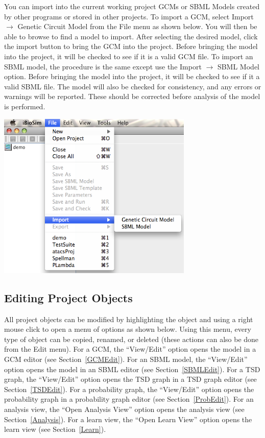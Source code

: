 \documentclass[titlepage,11pt]{article}
\begin{document}
\noindent
You can import into the current working project GCMs
or SBML Models created by other programs or stored in other projects. 
To import a GCM, select Import $\rightarrow$ Genetic Circuit Model
from the File menu as shown below. You will then be able to browse to
find a model to import.  After  selecting the desired model, click the 
import button
to bring the GCM into the project.  Before bringing the model into the 
project, it will be checked to see if it is a valid GCM file.
To import an SBML model, the procedure is the same except use the 
Import $\rightarrow$ SBML Model option.  Before bringing the model
into the project, it will be checked to see if it a valid SBML file.  
The model will also be checked for consistency, and any errors or
warnings will be reported.  These should be corrected before analysis 
of the model is performed.
\begin{center}
\includegraphics[height=80mm]{screenshots/import}
\end{center} 

\clearpage

\subsection{Editing Project Objects}

\noindent
All project objects can be modified by highlighting the object
and using a right mouse click to open a menu of options as shown
below. Using this menu, every type of object can be copied, renamed, or
deleted (these actions can also be done from the Edit menu).  
For a GCM, the ``View/Edit'' option opens the
model in a GCM editor (see Section~\ref{GCMEdit}). For an SBML model,
the ``View/Edit'' option opens the model in an SBML editor 
(see Section~\ref{SBMLEdit}). For a TSD graph, the ``View/Edit'' 
option opens the TSD graph in a TSD graph editor (see Section~\ref{TSDEdit}). 
For a probability graph, the ``View/Edit'' option opens
the probability graph in a probability graph editor 
(see Section~\ref{ProbEdit}). 
For an analysis view, the ``Open Analysis View'' option opens the
analysis view (see Section~\ref{Analysis}). For a learn view, the
``Open Learn View'' option opens the learn view (see Section~\ref{Learn}).
\end{document}
